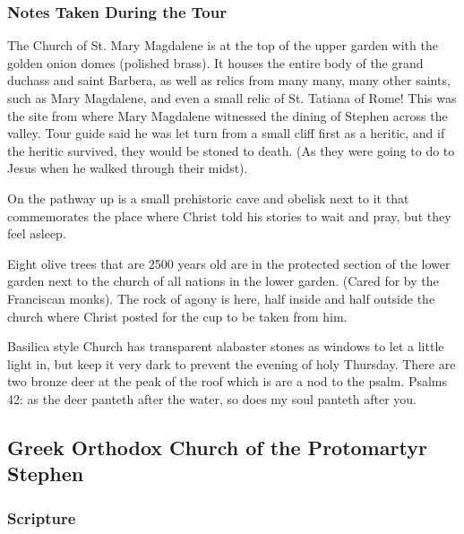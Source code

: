 \documentclass[letterpaper]{report}
\begin{document}
\subsubsection{Notes Taken During the Tour}
The Church of St. Mary Magdalene is at the top of the upper garden with the golden onion domes (polished brass).
It houses the entire body of the grand duchass and saint Barbera, as well as relics from many many, many other saints, such as Mary Magdalene,
and even a small relic of St. Tatiana of Rome! This was the site from where Mary Magdalene witnessed the dining of Stephen across the valley. Tour guide said he was let turn from a small cliff first as a heritic, and if the heritic survived, they would be stoned to death. (As they were going to do to Jesus when he walked through their midst).

On the pathway up is a small prehistoric cave and obelisk next to it that commemorates the place where Christ told his stories to wait and pray, but they feel asleep.

Eight olive trees that are 2500 years old are in the protected section of the lower garden next to the church of all nations in the lower garden. (Cared for by the Franciscan monks). The rock of agony is here, half inside and half outside the church where Christ posted for the cup to be taken from him.

Basilica style Church has transparent alabaster stones as windows to let a little light in, but keep it very dark to prevent the evening of holy Thursday.
There are two bronze deer at the peak of the roof which is are a nod to the psalm.
Psalms 42: as the deer panteth after the water, so does my soul panteth after you.

\clearpage
\subsection{Greek Orthodox Church of the Protomartyr Stephen}
\begin{multicols}{2}
	\mbox{}
\end{multicols}
\subsubsection{Scripture}
\end{document}
